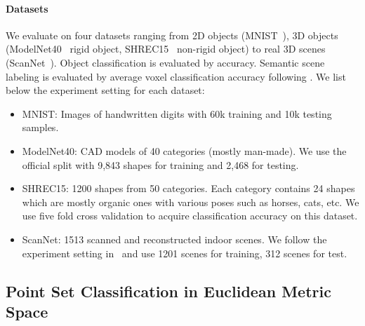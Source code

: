 \label{sec:exp}

\vspace{-0.15cm}
\paragraph{Datasets} We evaluate on four datasets ranging from 2D objects (MNIST~\cite{lecun1998gradient}), 3D objects (ModelNet40~\cite{wu20153d} rigid object, SHREC15~\cite{3dor.20151064} non-rigid object) to real 3D scenes (ScanNet~\cite{dai2017scannet}). Object classification is evaluated by accuracy.
Semantic scene labeling is evaluated by average voxel classification accuracy following \cite{dai2017scannet}. We list below the experiment setting for each dataset:
\begin{itemize}
    \item MNIST: Images of handwritten digits with 60k training and 10k testing samples.
    \item ModelNet40: CAD models of 40 categories (mostly man-made). We use the official split with 9,843 shapes for training and 2,468 for testing.
    \item SHREC15: 1200 shapes from 50 categories. Each category contains 24 shapes which are mostly organic ones with various poses such as horses, cats, etc. We use five fold cross validation to acquire classification accuracy on this dataset.
    \item ScanNet: 1513 scanned and reconstructed indoor scenes. We follow the experiment setting in~\cite{dai2017scannet} and use 1201 scenes for training, 312 scenes for test.
\end{itemize}


\vspace{-0.3cm}
\subsection{Point Set Classification in Euclidean Metric Space}

